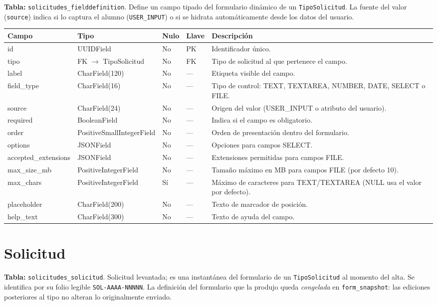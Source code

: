 \documentclass[12pt,letterpaper]{report}
\begin{document}
\textbf{Tabla:} \texttt{solicitudes\_fielddefinition}. Define un campo tipado
del formulario dinámico de un \texttt{TipoSolicitud}. La fuente del valor
(\texttt{source}) indica si lo captura el alumno (\texttt{USER\_INPUT}) o si se
hidrata automáticamente desde los datos del usuario.

\begin{longtable}{L{2.9cm} L{2.6cm} C{1.0cm} C{1.0cm} L{6.6cm}}
\toprule
\textbf{Campo} & \textbf{Tipo} & \textbf{Nulo} & \textbf{Llave} & \textbf{Descripción} \\
\midrule
\endhead
id & UUIDField & No & PK & Identificador único. \\
tipo & FK $\rightarrow$ TipoSolicitud & No & FK & Tipo de solicitud al que pertenece el campo. \\
label & CharField(120) & No & --- & Etiqueta visible del campo. \\
field\_type & CharField(16) & No & --- & Tipo de control: TEXT, TEXTAREA, NUMBER, DATE, SELECT o FILE. \\
source & CharField(24) & No & --- & Origen del valor (USER\_INPUT o atributo del usuario). \\
required & BooleanField & No & --- & Indica si el campo es obligatorio. \\
order & PositiveSmallIntegerField & No & --- & Orden de presentación dentro del formulario. \\
options & JSONField & No & --- & Opciones para campos SELECT. \\
accepted\_extensions & JSONField & No & --- & Extensiones permitidas para campos FILE. \\
max\_size\_mb & PositiveIntegerField & No & --- & Tamaño máximo en MB para campos FILE (por defecto 10). \\
max\_chars & PositiveIntegerField & Sí & --- & Máximo de caracteres para TEXT/TEXTAREA (NULL usa el valor por defecto). \\
placeholder & CharField(200) & No & --- & Texto de marcador de posición. \\
help\_text & CharField(300) & No & --- & Texto de ayuda del campo. \\
\bottomrule
\end{longtable}

\section{Solicitud}

\textbf{Tabla:} \texttt{solicitudes\_solicitud}. Solicitud levantada; es una
instantánea del formulario de un \texttt{TipoSolicitud} al momento del alta. Se
identifica por su folio legible \texttt{SOL-AAAA-NNNNN}. La definición del
formulario que la produjo queda \emph{congelada} en \texttt{form\_snapshot}: las
ediciones posteriores al tipo no alteran lo originalmente enviado.
\end{document}
